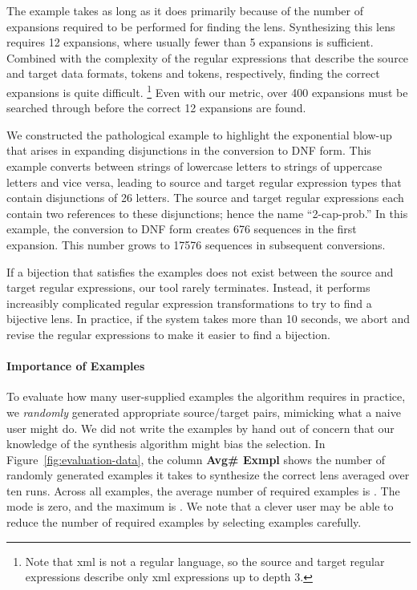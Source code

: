 \documentclass[numbers,10pt,preprint\ifanon ,nocopyrightspace\fi]{sigplanconf}
\begin{document}
The example  takes as long as it does primarily because of the
number of expansions required to be performed for finding the lens.
Synthesizing this lens requires 12 expansions, where usually
fewer than 5 expansions is sufficient.
Combined with the complexity of the regular expressions that describe the
source and
target data formats,  tokens and  tokens,
respectively, finding the correct expansions is quite difficult.
\footnote{Note that xml is not a regular language, so
  the source and target regular expressions describe only xml
  expressions up to depth 3.}
Even with our metric, over 400 expansions must be searched through before the
correct 12 expansions are found.

We constructed the pathological example  to
highlight the exponential blow-up that arises in expanding
disjunctions in the conversion to DNF form.  This example converts
between strings of lowercase letters to strings of uppercase letters
and vice versa, leading to source and target regular expression types
that contain disjunctions of 26 letters.  The source and target
regular expressions each contain two references to these disjunctions;
hence the name ``2-cap-prob.''  In this example, the conversion to DNF
form creates 676 sequences in the first expansion.  This number grows
to 17576 sequences in subsequent conversions. 


If a bijection that satisfies the examples does not exist between the
source and target regular expressions, our tool rarely terminates.
Instead, it performs increasibly complicated regular expression
transformations to try to find a bijective lens.  In practice, if the
system takes more than 10 seconds, we abort and revise the regular
expressions to make it easier to find a bijection.


\paragraph*{Importance of Examples}
To evaluate how many user-supplied examples the algorithm requires in
practice, we \textit{randomly} generated appropriate source/target
pairs, mimicking what a naive user might do.  We did not write the
examples by hand out of concern that our knowledge of the synthesis
algorithm might bias the selection.  In
Figure~\ref{fig:evaluation-data}, the column \textbf{Avg\# Exmpl} shows
the number of randomly generated examples it takes to synthesize the
correct lens averaged over ten runs.  Across all examples, the average
number of required examples is . The mode is zero, and the
maximum is .  We note that a clever user may be able to reduce the
number of required examples by selecting examples carefully.
\end{document}
